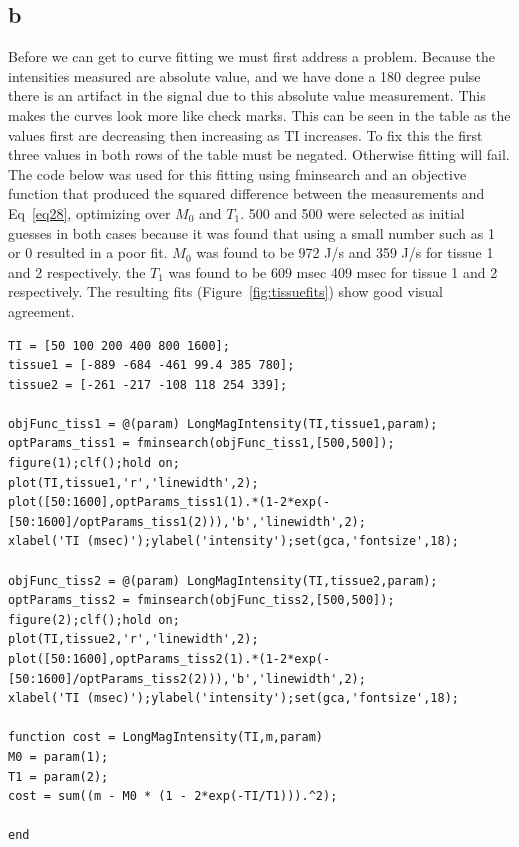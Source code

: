 \documentclass[12pt]{article}
\begin{document}
\subsection{b}
Before we can get to curve fitting we must first address a problem. Because the intensities measured are absolute value, and we have done a 180 degree pulse there is an artifact in the signal due to this absolute value measurement. This makes the curves look more like check marks. This can be seen in the table as the values first are decreasing then increasing as TI increases. To fix this the first three values in both rows of the table must be negated. Otherwise fitting will fail.
The code below was used for this fitting using fminsearch and an objective function that produced the squared difference between the measurements and Eq~\ref{eq28}, optimizing over $M_0$ and $T_1$. 500 and 500 were selected as initial guesses in both cases because it was found that using a small number such as 1 or 0 resulted in a poor fit. $M_0$ was found to be 972 J/s and 359 J/s for tissue 1 and 2 respectively. the $T_1$ was found to be 609 msec 409 msec for tissue 1 and 2 respectively. The resulting fits (Figure~\ref{fig:tissuefits}) show good visual agreement.
\begin{lstlisting}[style=Matlab-editor]
%Q5
TI = [50 100 200 400 800 1600];
tissue1 = [-889 -684 -461 99.4 385 780];
tissue2 = [-261 -217 -108 118 254 339];

objFunc_tiss1 = @(param) LongMagIntensity(TI,tissue1,param);
optParams_tiss1 = fminsearch(objFunc_tiss1,[500,500]);
figure(1);clf();hold on;
plot(TI,tissue1,'r','linewidth',2);
plot([50:1600],optParams_tiss1(1).*(1-2*exp(-[50:1600]/optParams_tiss1(2))),'b','linewidth',2);
xlabel('TI (msec)');ylabel('intensity');set(gca,'fontsize',18);

objFunc_tiss2 = @(param) LongMagIntensity(TI,tissue2,param);
optParams_tiss2 = fminsearch(objFunc_tiss2,[500,500]);
figure(2);clf();hold on;
plot(TI,tissue2,'r','linewidth',2);
plot([50:1600],optParams_tiss2(1).*(1-2*exp(-[50:1600]/optParams_tiss2(2))),'b','linewidth',2);
xlabel('TI (msec)');ylabel('intensity');set(gca,'fontsize',18);

function cost = LongMagIntensity(TI,m,param)
M0 = param(1);
T1 = param(2);
cost = sum((m - M0 * (1 - 2*exp(-TI/T1))).^2);

end
\end{lstlisting}
\end{document}
